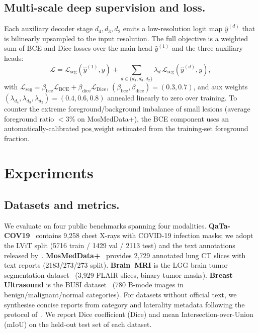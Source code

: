 \documentclass[runningheads]{llncs}
\begin{document}
\subsection{Multi-scale deep supervision and loss.}
\label{sec:loss}
Each auxiliary decoder stage $d_4,d_3,d_2$ emits a low-resolution
logit map $\hat y^{(d)}$ that is bilinearly upsampled to the input
resolution. The full objective is a weighted sum of BCE and Dice
losses over the main head $\hat y^{(1)}$ and the three auxiliary
heads:
\begin{equation}
\mathcal{L}
=\mathcal{L}_{\text{seg}}(\hat y^{(1)},y)
+\sum_{d\in\{d_4,d_3,d_2\}} \lambda_d \,
\mathcal{L}_{\text{seg}}(\hat y^{(d)},y),
\end{equation}
with
$\mathcal{L}_{\text{seg}}\!=\!\beta_\text{bce}\mathcal{L}_\text{BCE}
\!+\!\beta_\text{dice}\mathcal{L}_\text{Dice}$,
$(\beta_\text{bce},\beta_\text{dice})\!=\!(0.3,0.7)$, and aux weights
$(\lambda_{d_4},\lambda_{d_3},\lambda_{d_2})\!=\!(0.4,0.6,0.8)$
annealed linearly to zero over training. To counter the extreme
foreground/background imbalance of small lesions (average foreground
ratio $<\!3\%$ on MosMedData+), the BCE component uses an
automatically-calibrated $\mathrm{pos\_weight}$ estimated from the
training-set foreground fraction.

\section{Experiments}
\label{sec:experiments}

\subsection{Datasets and metrics.}
\label{sec:datasets}
We evaluate on four public benchmarks spanning four modalities.
\textbf{QaTa-COV19}~\cite{degerli2022osegnet} contains 9{,}258
chest X-rays with COVID-19 infection masks; we adopt the LViT split
(5716 train / 1429 val / 2113 test) and the text annotations released
by~\cite{li2023lvit}.
\textbf{MosMedData+}~\cite{morozov2020mosmeddata,li2023lvit} provides
2{,}729 annotated lung CT slices with text reports (2183/273/273
split). \textbf{Brain~MRI} is the LGG brain tumor segmentation
dataset~\cite{buda2019association} (3{,}929 FLAIR slices, binary
tumor masks). \textbf{Breast Ultrasound} is the BUSI
dataset~\cite{aldhabyani2020busi} (780 B-mode images in
benign/malignant/normal categories). For datasets without official
text, we synthesise concise reports from category and laterality
metadata following the protocol of~\cite{li2023lvit}. We report
Dice coefficient (Dice) and mean Intersection-over-Union (mIoU) on
the held-out test set of each dataset.
\end{document}
